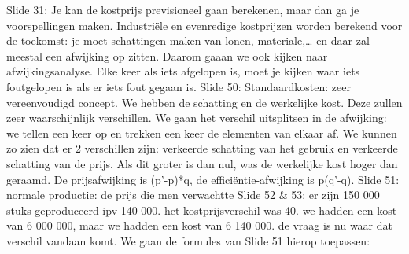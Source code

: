 \documentclass[10pt,a4paper]{report}
\begin{document}
Slide 31: Je kan de kostprijs previsioneel gaan berekenen, maar dan ga je voorspellingen maken. Industriële en evenredige kostprijzen worden berekend voor de toekomst: je moet schattingen maken van lonen, materiale,… en daar zal meestal een afwijking op zitten. Daarom gaaan we ook kijken naar afwijkingsanalyse. 
Elke keer als iets afgelopen is, moet je kijken waar iets foutgelopen is als er iets fout gegaan is.
Slide 50: Standaardkosten: zeer vereenvoudigd concept. We hebben de schatting en de werkelijke kost. Deze zullen zeer waarschijnlijk verschillen. We gaan het verschil uitsplitsen in de afwijking: we tellen een keer op en trekken een keer de elementen van elkaar af. We kunnen zo zien dat er 2 verschillen zijn: verkeerde schatting van het gebruik en verkeerde schatting van de prijs. Als dit groter is dan nul, was de werkelijke kost hoger dan geraamd. De prijsafwijking is (p'-p)*q, de efficiëntie-afwijking is p(q'-q). 
Slide 51: normale productie: de prijs die men verwachtte
Slide 52 $\&$ 53: er zijn 150 000 stuks geproduceerd ipv 140 000. het kostprijsverschil was 40. we hadden een kost van 6 000 000, maar we hadden een kost van 6 140 000. de vraag is nu waar dat verschil vandaan komt. We gaan de formules van Slide 51 hierop toepassen:
\end{document}

